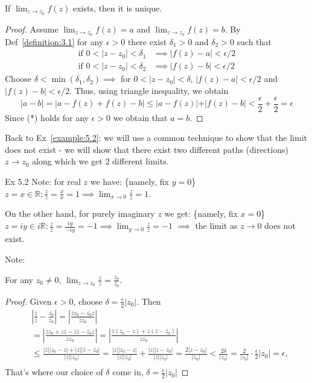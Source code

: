 \begin{claim}\label{claim:3.1}
    If $\lim_{z \to z_0} f(z)$ exists, then it is unique.

\begin{proof}
 Assume $\lim_{z \to z_0} f(z) = a$ and $\lim_{z \to z_0} f(z) = b$. By Def~\ref{definition:3.1} for any $\epsilon > 0$ there exist $\delta_1 > 0$ and $\delta_2 > 0$ such that
\begin{align*}
\text{if } 0 < \vert z - z_0\vert  < \delta_1 &\implies \vert f(z) - a\vert  < \epsilon/2 \\
\text{if } 0 < \vert z - z_0\vert  < \delta_2 &\implies \vert f(z) - b\vert  < \epsilon/2
\end{align*}
Choose $\delta < \min(\delta_1, \delta_2) \implies$ for $0 < \vert z - z_0\vert  < \delta$, $\vert f(z) - a\vert  < \epsilon/2$ and $\vert f(z) - b\vert  < \epsilon/2$. 
Thus, using triangle inequality, we obtain
\[ \vert a - b\vert  = \vert a - f(z) + f(z) - b\vert  \leq \vert a - f(z)\vert  + \vert f(z) - b\vert  < \frac{\epsilon}{2} + \frac{\epsilon}{2} = \epsilon \tag{*}\]
Since (*) holds for any $\epsilon > 0$ we obtain that $a = b$.
\end{proof}
\end{claim}
Back to Ex~\ref{example:5.2}: we will use a common technique to show that the limit does not exist - we will show that there exist two different paths (directions) $z \to z_0$ along which we get 2 different limits.

\begin{soln}
Ex 5.2  Note: for real $z$ we have: \{namely, fix $y = 0$\}
$z = x \in \mathbb{R}: \frac{z}{\bar{z}} = \frac{x}{x} = 1 \implies \lim_{x \to 0} \frac{z}{\bar{z}} = 1$.

On the other hand, for purely imaginary $z$ we get: \{namely, fix $x = 0$\}
$z = iy \in i\mathbb{R}: \frac{z}{\bar{z}} = \frac{iy}{-iy} = -1 \implies \lim_{y \to 0} \frac{z}{\bar{z}} = -1$
$\implies$ the limit as $z \to 0$ does not exist.
\end{soln}
Note: 
\begin{remark}  For any $z_0 \neq 0$, $\lim_{z \to z_0} \frac{z}{\bar{z}} = \frac{z_0}{\bar{z_0}}$. 
    \begin{proof} Given $\epsilon > 0$, choose $\delta = \frac{\epsilon}2 \vert z_0\vert $. Then
\begin{align*} &\left| \frac{\bar{z}}{\bar{z}} - \frac{\bar{z_0}}{z_0} \right| = \left| \frac{\bar{z}z_0 - \bar{z_0}z}{z z_0} \right| \\
        &= \left| \frac{\bar{z}z_0 + z\bar{z} - z\bar{z} - \bar{z_0}z}{z z_0} \right| = \left| \frac{\bar{z}(z_0 - z) + z(\bar{z} - \bar{z_0})}{z z_0} \right| \\
        & \leq \frac{|\bar{z}||z_0 - z| + |z||\bar{z} - \bar{z_0}|}{|z||z_0|} = \frac{|z||z_0 - z|}{|z||z_0|} + \frac{|z||z - z_0|}{|z||z_0|} = \frac{2|z - z_0|}{|z_0|} < \frac{2\delta}{|z_0|} = \frac{2}{|z_0|} \cdot \frac{\epsilon}{2}|z_0| = \epsilon, \\
\end{align*}
That's where our choice of $\delta$ come in,  $\delta = \frac{\epsilon}{2}|z_0|$
    \end{proof}
\end{remark}

